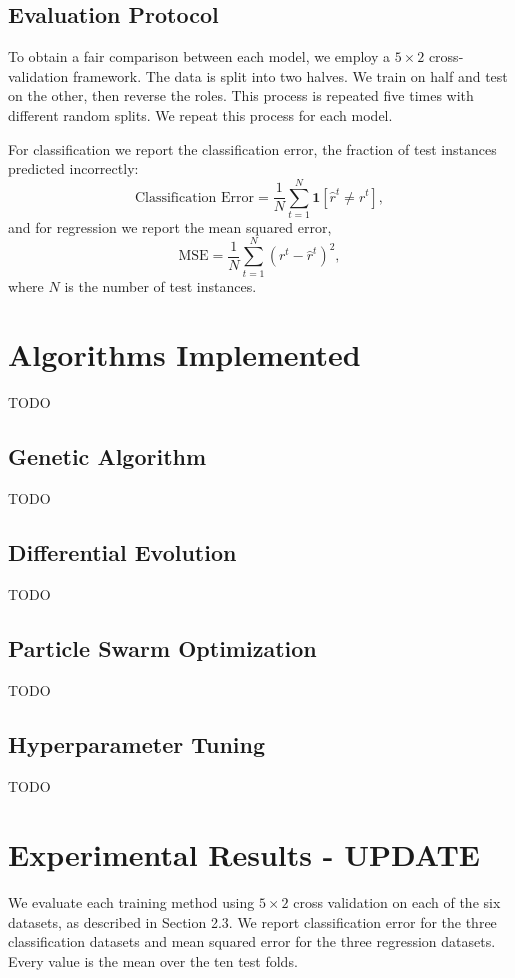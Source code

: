 \documentclass[twoside,11pt]{article}
\begin{document}
\subsection{Evaluation Protocol}
To obtain a fair comparison between each model, we employ a $5 \times 2$ cross-validation framework. The data is split into two halves. We train on half and test on the other, then reverse the roles. This process is repeated five times with different random splits. We repeat this process for each model.

For classification we report the classification error, the fraction of test instances predicted incorrectly:
\begin{equation}
    \text{Classification Error} = \frac{1}{N}\sum_{t=1}^{N} \mathbf{1}\left[\hat{r}^t \neq r^t\right],
\end{equation}
and for regression we report the mean squared error,
\begin{equation}
    \text{MSE} = \frac{1}{N}\sum_{t=1}^{N} \left(r^t - \hat{r}^t\right)^2,
\end{equation}
where $N$ is the number of test instances.

\section{Algorithms Implemented}
TODO

\subsection{Genetic Algorithm}
TODO

\subsection{Differential Evolution}
TODO

\subsection{Particle Swarm Optimization}
TODO

\subsection{Hyperparameter Tuning}
\label{sec:tuning}
TODO

\section{Experimental Results - UPDATE}
We evaluate each training method using $5 \times 2$ cross validation on each of the six datasets, as described in Section 2.3. We report classification error for the three classification datasets and mean squared error for the three regression datasets. Every value is the mean over the ten test folds.
\end{document}
